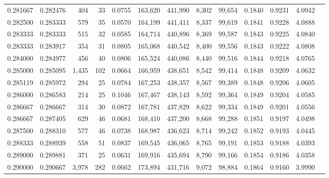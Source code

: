 \begin{tabular}{rrrrrrrrrrrrr}
0.281667 & 0.282476 &   404 &  33 &                                     0.0755 & 163,620 & 441,990 &   8,302 &  99,654 & 0.1840 & 0.9231 & 4.0942 \\
0.282500 & 0.283333 &   579 &  35 &                                     0.0570 & 164,199 & 441,411 &   8,337 &  99,619 & 0.1841 & 0.9228 & 4.0888 \\
0.283333 & 0.283333 &   515 &  32 &                                     0.0585 & 164,714 & 440,896 &   8,369 &  99,587 & 0.1843 & 0.9225 & 4.0840 \\
0.283333 & 0.283917 &   354 &  31 &                                     0.0805 & 165,068 & 440,542 &   8,400 &  99,556 & 0.1843 & 0.9222 & 4.0808 \\
0.284000 & 0.284977 &   456 &  40 &                                     0.0806 & 165,524 & 440,086 &   8,440 &  99,516 & 0.1844 & 0.9218 & 4.0765 \\
0.285000 & 0.285095 & 1,435 & 102 &                                     0.0664 & 166,959 & 438,651 &   8,542 &  99,414 & 0.1848 & 0.9209 & 4.0632 \\
0.285119 & 0.285972 &   294 &  25 &                                     0.0784 & 167,253 & 438,357 &   8,567 &  99,389 & 0.1848 & 0.9206 & 4.0605 \\
0.286000 & 0.286583 &   214 &  25 &                                     0.1046 & 167,467 & 438,143 &   8,592 &  99,364 & 0.1849 & 0.9204 & 4.0585 \\
0.286667 & 0.286667 &   314 &  30 &                                     0.0872 & 167,781 & 437,829 &   8,622 &  99,334 & 0.1849 & 0.9201 & 4.0556 \\
0.286667 & 0.287405 &   629 &  46 &                                     0.0681 & 168,410 & 437,200 &   8,668 &  99,288 & 0.1851 & 0.9197 & 4.0498 \\
0.287500 & 0.288310 &   577 &  46 &                                     0.0738 & 168,987 & 436,623 &   8,714 &  99,242 & 0.1852 & 0.9193 & 4.0445 \\
0.288333 & 0.288939 &   558 &  51 &                                     0.0837 & 169,545 & 436,065 &   8,765 &  99,191 & 0.1853 & 0.9188 & 4.0393 \\
0.289000 & 0.289881 &   371 &  25 &                                     0.0631 & 169,916 & 435,694 &   8,790 &  99,166 & 0.1854 & 0.9186 & 4.0358 \\
0.290000 & 0.290667 & 3,978 & 282 &                                     0.0662 & 173,894 & 431,716 &   9,072 &  98,884 & 0.1864 & 0.9160 & 3.9990 \\

\end{tabular}
